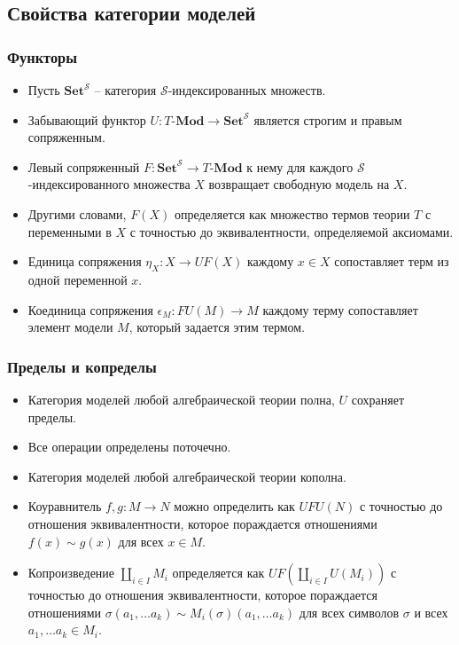 \documentclass{beamer}
\theoremstyle{definition}
\newcommand{\cat}[1]{\mathbf{#1}}
\newcommand{\Set}{\cat{Set}}
\newcommand{\Mod}[1]{#1\text{-}\cat{Mod}}
\begin{document}
\subsection{Свойства категории моделей}

\begin{frame}
\frametitle{Функторы}
\begin{itemize}
\item Пусть $\Set^\mathcal{S}$ -- категория $\mathcal{S}$-индексированных множеств.
\item Забывающий функтор $U : \Mod{T} \to \Set^\mathcal{S}$ является строгим и правым сопряженным.
\item Левый сопряженный $F : \Set^\mathcal{S} \to \Mod{T}$ к нему для каждого $\mathcal{S}$-индексированного множества $X$ возвращает свободную модель на $X$.
\item Другими словами, $F(X)$ определяется как множество термов теории $T$ с переменными в $X$ с точностью до эквивалентности, определяемой аксиомами.
\item Единица сопряжения $\eta_X : X \to U F(X)$ каждому $x \in X$ сопоставляет терм из одной переменной $x$.
\item Коединица сопряжения $\epsilon_M : F U(M) \to M$ каждому терму сопоставляет элемент модели $M$, который задается этим термом.
\end{itemize}
\end{frame}

\begin{frame}
\frametitle{Пределы и копределы}
\begin{itemize}
\item Категория моделей любой алгебраической теории полна, $U$ сохраняет пределы.
\item Все операции определены поточечно.
\item Категория моделей любой алгебраической теории кополна.
\item Коуравнитель $f,g : M \to N$ можно определить как $U F U(N)$ с точностью до отношения эквивалентности, которое пораждается отношениями $f(x) \sim g(x)$ для всех $x \in M$.
\item Копроизведение $\coprod_{i \in I} M_i$ определяется как $U F (\coprod_{i \in I} U(M_i))$ с точностью до отношения эквивалентности,
которое пораждается отношениями $\sigma(a_1, \ldots a_k) \sim M_i(\sigma)(a_1, \ldots a_k)$ для всех символов $\sigma$ и всех $a_1, \ldots a_k \in M_i$.
\end{itemize}
\end{frame}
\end{document}
